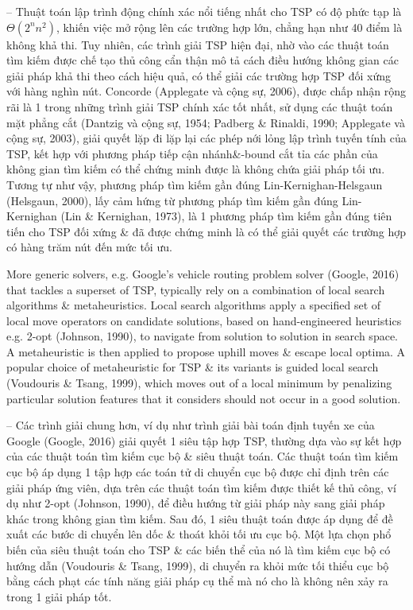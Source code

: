 \documentclass{article}
\begin{document}
\begin{itemize}
    -- Thuật toán lập trình động chính xác nổi tiếng nhất cho TSP có độ phức tạp là $\Theta(2^nn^2)$, khiến việc mở rộng lên các trường hợp lớn, chẳng hạn như 40 điểm là không khả thi. Tuy nhiên, các trình giải TSP hiện đại, nhờ vào các thuật toán tìm kiếm được chế tạo thủ công cẩn thận mô tả cách điều hướng không gian các giải pháp khả thi theo cách hiệu quả, có thể giải các trường hợp TSP đối xứng với hàng nghìn nút. Concorde (Applegate và cộng sự, 2006), được chấp nhận rộng rãi là 1 trong những trình giải TSP chính xác tốt nhất, sử dụng các thuật toán mặt phẳng cắt (Dantzig và cộng sự, 1954; Padberg \& Rinaldi, 1990; Applegate và cộng sự, 2003), giải quyết lặp đi lặp lại các phép nới lỏng lập trình tuyến tính của TSP, kết hợp với phương pháp tiếp cận nhánh\&-bound cắt tỉa các phần của không gian tìm kiếm có thể chứng minh được là không chứa giải pháp tối ưu. Tương tự như vậy, phương pháp tìm kiếm gần đúng Lin-Kernighan-Helsgaun (Helsgaun, 2000), lấy cảm hứng từ phương pháp tìm kiếm gần đúng Lin-Kernighan (Lin \& Kernighan, 1973), là 1 phương pháp tìm kiếm gần đúng tiên tiến cho TSP đối xứng \& đã được chứng minh là có thể giải quyết các trường hợp có hàng trăm nút đến mức tối ưu.
    
    More generic solvers, e.g. Google's vehicle routing problem solver (Google, 2016) that tackles a superset of TSP, typically rely on a combination of local search algorithms \& metaheuristics. Local search algorithms apply a specified set of local move operators on candidate solutions, based on hand-engineered heuristics e.g. 2-opt (Johnson, 1990), to navigate from solution to solution in search space. A metaheuristic is then applied to propose uphill moves \& escape local optima. A popular choice of metaheuristic for TSP \& its variants is guided local search (Voudouris \& Tsang, 1999), which moves out of a local minimum by penalizing particular solution features that it considers should not occur in a good solution.
    
    -- Các trình giải chung hơn, ví dụ như trình giải bài toán định tuyến xe của Google (Google, 2016) giải quyết 1 siêu tập hợp TSP, thường dựa vào sự kết hợp của các thuật toán tìm kiếm cục bộ \& siêu thuật toán. Các thuật toán tìm kiếm cục bộ áp dụng 1 tập hợp các toán tử di chuyển cục bộ được chỉ định trên các giải pháp ứng viên, dựa trên các thuật toán tìm kiếm được thiết kế thủ công, ví dụ như 2-opt (Johnson, 1990), để điều hướng từ giải pháp này sang giải pháp khác trong không gian tìm kiếm. Sau đó, 1 siêu thuật toán được áp dụng để đề xuất các bước di chuyển lên dốc \& thoát khỏi tối ưu cục bộ. Một lựa chọn phổ biến của siêu thuật toán cho TSP \& các biến thể của nó là tìm kiếm cục bộ có hướng dẫn (Voudouris \& Tsang, 1999), di chuyển ra khỏi mức tối thiểu cục bộ bằng cách phạt các tính năng giải pháp cụ thể mà nó cho là không nên xảy ra trong 1 giải pháp tốt.
    

\end{itemize}
\end{document}
